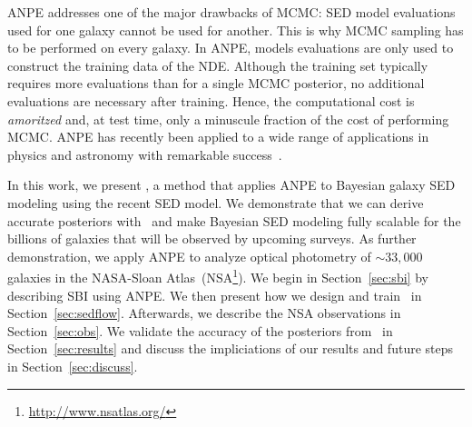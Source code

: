 ANPE addresses one of the major drawbacks of MCMC: SED model evaluations used
for one galaxy cannot be used for another.
This is why MCMC sampling has to be performed on every galaxy. 
In ANPE, models evaluations are only used to construct the training data of the
NDE. 
Although the training set typically requires more evaluations than for a single
MCMC posterior, no additional evaluations are necessary after training. 
Hence, the computational cost is \emph{amoritzed} and, at test time, only a
minuscule fraction of the cost of performing MCMC.
ANPE has recently been applied to a wide range of applications in physics and
astronomy with remarkable success~\citep{stein2020, wong2020, dax2021,
zhang2021}.

In this work, we present \sedflow, a method that applies ANPE to Bayesian
galaxy SED modeling using the recent \cite{hahn2022} SED model. 
We demonstrate that we can derive accurate posteriors with \sedflow~and make
Bayesian SED modeling fully scalable for the billions of galaxies that will be
observed by upcoming surveys.
As further demonstration, we apply ANPE to analyze optical photometry of
${\sim}33,000$ galaxies in the NASA-Sloan
Atlas~(NSA\footnote{\url{http://www.nsatlas.org/}}). 
We begin in Section~\ref{sec:sbi} by describing SBI using ANPE.
We then  present how we design and train \sedflow~in
Section~\ref{sec:sedflow}. 
Afterwards, we describe the NSA observations in Section~\ref{sec:obs}. 
We validate the accuracy of the posteriors from \sedflow~in
Section~\ref{sec:results} and discuss the impliciations of our results and
future steps in Section~\ref{sec:discuss}. 
